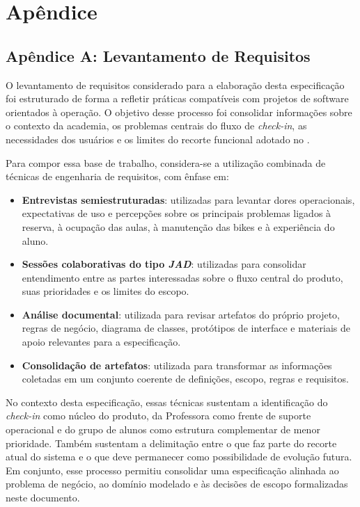 \section*{Apêndice}

\subsection*{Apêndice A: Levantamento de Requisitos}
\label{ap:levantamento-requisitos}

O levantamento de requisitos considerado para a elaboração desta especificação foi estruturado de forma a refletir práticas compatíveis com projetos de software orientados à operação. O objetivo desse processo foi consolidar informações sobre o contexto da academia, os problemas centrais do fluxo de \textit{check-in}, as necessidades dos usuários e os limites do recorte funcional adotado no \ProjetoNome.

Para compor essa base de trabalho, considera-se a utilização combinada de técnicas de engenharia de requisitos, com ênfase em:

\begin{itemize}[leftmargin=1.2cm]
    \item \textbf{Entrevistas semiestruturadas}: utilizadas para levantar dores operacionais, expectativas de uso e percepções sobre os principais problemas ligados à reserva, à ocupação das aulas, à manutenção das bikes e à experiência do aluno.
    \item \textbf{Sessões colaborativas do tipo \textit{JAD}}: utilizadas para consolidar entendimento entre as partes interessadas sobre o fluxo central do produto, suas prioridades e os limites do escopo.
    \item \textbf{Análise documental}: utilizada para revisar artefatos do próprio projeto, regras de negócio, diagrama de classes, protótipos de interface e materiais de apoio relevantes para a especificação.
    \item \textbf{Consolidação de artefatos}: utilizada para transformar as informações coletadas em um conjunto coerente de definições, escopo, regras e requisitos.
\end{itemize}

No contexto desta especificação, essas técnicas sustentam a identificação do \textit{check-in} como núcleo do produto, da Professora como frente de suporte operacional e do grupo de alunos como estrutura complementar de menor prioridade. Também sustentam a delimitação entre o que faz parte do recorte atual do sistema e o que deve permanecer como possibilidade de evolução futura. Em conjunto, esse processo permitiu consolidar uma especificação alinhada ao problema de negócio, ao domínio modelado e às decisões de escopo formalizadas neste documento.

